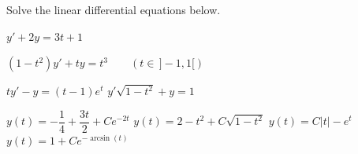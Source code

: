 \begin{Exercise} Solve the linear differential equations below.
\begin{multicols}{2}

\Question $y' + 2 y = 3 t + 1$


\Question $\left( 1 - t^2 \right) y' + t y = t^3 \qquad\left(t \in \, ] -1 , 1 [\right)$

\Question $t y' - y = \left( t - 1 \right) e^t$
\Question $y' \sqrt{1 - t^2} + y = 1$

\EndCurrentQuestion
\end{multicols}
\end{Exercise}

\begin{Answer}
    \begin{multicols}{2}
        \Question $y(t) = -\dfrac{1}{4} + \dfrac{3t}{2} + Ce^{-2t}$
        \Question $y(t) = 2 - t^2 + C\sqrt{1-t^2}$
        \Question $y(t) = C|t| - e^{t}$
        \Question $y(t) = 1 + Ce^{-\arcsin(t)}$
        \EndCurrentQuestion
    \end{multicols}
\end{Answer}

